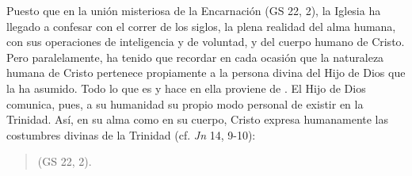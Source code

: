 	 Puesto que en la unión misteriosa de la Encarnación  (GS 22, 2), la Iglesia ha llegado a confesar con el correr de los siglos, la plena realidad del alma humana, con sus operaciones de inteligencia y de voluntad, y del cuerpo humano de Cristo. Pero paralelamente, ha tenido que recordar en cada ocasión que la naturaleza humana de Cristo pertenece propiamente a la persona divina del Hijo de Dios que la ha asumido. Todo lo que es y hace en ella proviene de . El Hijo de Dios comunica, pues, a su humanidad su propio modo personal de existir en la Trinidad. Así, en su alma como en su cuerpo, Cristo expresa humanamente las costumbres divinas de la Trinidad (cf. \emph{Jn} 14, 9-10):
	
	\begin{quote}
		 (GS 22, 2).
	\end{quote}
	
